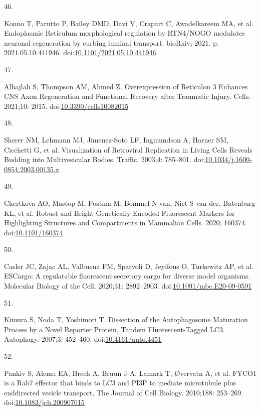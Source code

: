 \documentclass[
  12pt,
  a4paper,
]{book}
\newlength{\cslhangindent}
\newlength{\csllabelwidth}
\newlength{\cslentryspacingunit} %
\newenvironment{CSLReferences}[2] %
 {%
  \setlength{\parindent}{0pt}
  \ifodd #1
  \let\oldpar\par
  \def\par{\hangindent=\cslhangindent\oldpar}
  \fi
  \setlength{\parskip}{#2\cslentryspacingunit}
 }%
 {}
\newcommand{\CSLLeftMargin}[1]{\parbox[t]{\csllabelwidth}{#1}}
\newcommand{\CSLRightInline}[1]{\parbox[t]{\linewidth - \csllabelwidth}{#1}\break}
\begin{document}
\begin{CSLReferences}{0}{0}
\leavevmode{}%
\CSLLeftMargin{46. }%
\CSLRightInline{Konno T, Parutto P, Bailey DMD, Davì V, Crapart C, Awadelkareem MA, et al. Endoplasmic {Reticulum} morphological regulation by {RTN4}/{NOGO} modulates neuronal regeneration by curbing luminal transport. {bioRxiv}; 2021. p. 2021.05.10.441946. doi:\href{https://doi.org/10.1101/2021.05.10.441946}{10.1101/2021.05.10.441946}}

\leavevmode{}%
\CSLLeftMargin{47. }%
\CSLRightInline{Alhajlah S, Thompson AM, Ahmed Z. Overexpression of {Reticulon} 3 {Enhances CNS Axon Regeneration} and {Functional Recovery} after {Traumatic Injury}. Cells. 2021;10: 2015. doi:\href{https://doi.org/10.3390/cells10082015}{10.3390/cells10082015}}

\leavevmode{}%
\CSLLeftMargin{48. }%
\CSLRightInline{Sherer NM, Lehmann MJ, Jimenez-Soto LF, Ingmundson A, Horner SM, Cicchetti G, et al. Visualization of {Retroviral Replication} in {Living Cells Reveals Budding} into {Multivesicular Bodies}. Traffic. 2003;4: 785--801. doi:\href{https://doi.org/10.1034/j.1600-0854.2003.00135.x}{10.1034/j.1600-0854.2003.00135.x}}

\leavevmode{}%
\CSLLeftMargin{49. }%
\CSLRightInline{Chertkova AO, Mastop M, Postma M, Bommel N van, Niet S van der, Batenburg KL, et al. Robust and {Bright Genetically Encoded Fluorescent Markers} for {Highlighting Structures} and {Compartments} in {Mammalian Cells}. 2020; 160374. doi:\href{https://doi.org/10.1101/160374}{10.1101/160374}}

\leavevmode{}%
\CSLLeftMargin{50. }%
\CSLRightInline{Casler JC, Zajac AL, Valbuena FM, Sparvoli D, Jeyifous O, Turkewitz AP, et al. {ESCargo}: A regulatable fluorescent secretory cargo for diverse model organisms. Molecular Biology of the Cell. 2020;31: 2892--2903. doi:\href{https://doi.org/10.1091/mbc.E20-09-0591}{10.1091/mbc.E20-09-0591}}

\leavevmode{}%
\CSLLeftMargin{51. }%
\CSLRightInline{Kimura S, Noda T, Yoshimori T. Dissection of the {Autophagosome Maturation Process} by a {Novel Reporter Protein}, {Tandem Fluorescent-Tagged LC3}. Autophagy. 2007;3: 452--460. doi:\href{https://doi.org/10.4161/auto.4451}{10.4161/auto.4451}}

\leavevmode{}%
\CSLLeftMargin{52. }%
\CSLRightInline{Pankiv S, Alemu EA, Brech A, Bruun J-A, Lamark T, Øvervatn A, et al. {FYCO1} is a {Rab7} effector that binds to {LC3} and {PI3P} to mediate microtubule plus end\textendash directed vesicle transport. The Journal of Cell Biology. 2010;188: 253--269. doi:\href{https://doi.org/10.1083/jcb.200907015}{10.1083/jcb.200907015}}


\end{CSLReferences}
\end{document}
